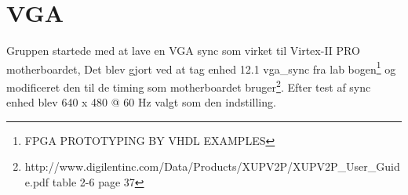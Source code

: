 \section{VGA}
Gruppen startede med at lave en VGA sync som virket til Virtex-II PRO motherboardet, Det blev gjort ved at tag enhed 12.1 vga\_sync fra lab bogen\footnote{FPGA PROTOTYPING BY VHDL EXAMPLES} og modificeret den til de timing som motherboardet bruger\footnote{http://www.digilentinc.com/Data/Products/XUPV2P/XUPV2P\_User\_Guide.pdf table 2-6 page 37}.
Efter test af sync enhed blev 640 x 480 @ 60 Hz valgt som den indstilling.
